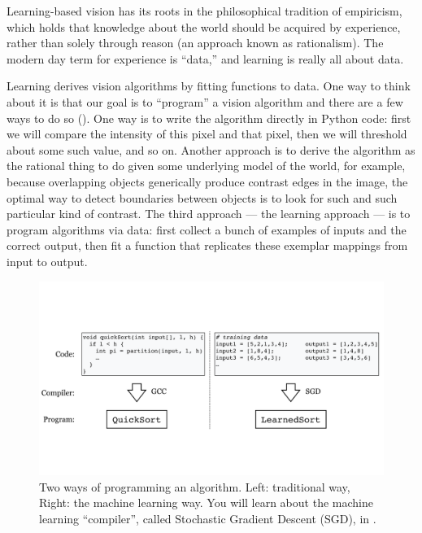 Learning-based vision has its roots in the philosophical tradition of empiricism, which holds that knowledge about the world should be acquired by experience, rather than solely through reason (an approach known as rationalism). The modern day term for experience is ``data,'' and learning is really all about data.



Learning derives vision algorithms by fitting functions to data. One way to think about it is that our goal is to ``program'' a vision algorithm and there are a few ways to do so (\fig{\ref{fig:taxonomy:programming_vs_learning}}). One way is to write the algorithm directly in Python code: first we will compare the intensity of this pixel and that pixel, then we will threshold about some such value, and so on. Another approach is to derive the algorithm as the rational thing to do given some underlying model of the world, for example, because overlapping objects generically produce contrast edges in the image, the optimal way to detect boundaries between objects is to look for such and such particular kind of contrast. The third approach --- the learning approach --- is to program algorithms via data: first collect a bunch of examples of inputs and the correct output, then fit a function that replicates these exemplar mappings from input to output.


\begin{figure}[t]
    \centerline{
        \includegraphics[width=1\linewidth]{figures/taxonomy/programming_vs_learning.pdf}
    }
    \caption{Two ways of programming an algorithm. Left: traditional way, Right: the machine learning way. You will learn about the machine learning ``compiler'', called Stochastic Gradient Descent (SGD), in \chap{\ref{chapter:backpropagation}}.}
    \label{fig:taxonomy:programming_vs_learning}
\end{figure}


